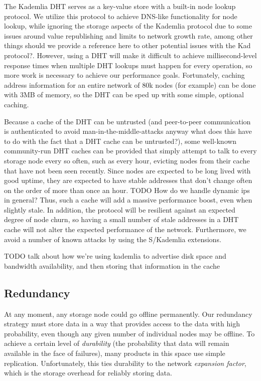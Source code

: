 \documentclass[a4paper,10pt]{article} \usepackage[utf8]{inputenc}
\newcommand{\todo}[1]{{\color{red} TODO #1 }}
\newcommand{\bs}[1]{{\color{red}#1}}
\begin{document}
The Kademlia DHT serves as a key-value store with a built-in node lookup
protocol. We utilize this protocol to achieve DNS-like functionality for node
lookup, while ignoring the storage aspects of the Kademlia protocol due to some
issues around value republishing and limits to network growth rate, among 
other things \bs{should we provide a reference here to other potential issues 
with the Kad protocol?}.
However, using a DHT will make it difficult to achieve millisecond-level
response times when multiple DHT lookups must happen for every operation, so
more work is necessary to achieve our performance goals. Fortunately, caching
address information for an entire network of 80k nodes (for example) can be done
with 3MB of memory, so the DHT can be sped up with some simple, optional
caching.

Because a cache of the DHT can be untrusted (and peer-to-peer communication is
authenticated to avoid man-in-the-middle-attacks anyway \bs{what does this have 
to do with the fact that a DHT cache can be untrusted?}), some well-known
community-run DHT caches can be provided that simply attempt to talk to every
storage node every so often, such as every hour, evicting nodes from their
cache that have not been seen recently.
Since nodes are expected to be long lived with good uptime, they
are expected to have stable addresses that don't change often on the order of
more than once an hour. \todo{How do we handle dynamic ips in general?} Thus, such a cache will add a massive performance boost, even when slightly stale.
In addition, the protocol will be resilient against an expected degree of node
churn, so having a small number of stale addresses in a DHT cache will not alter
the expected performance of the network. Furthermore, we avoid a number of known
attacks by using the S/Kademlia extensions. \cite{skad}

\todo{talk about how we're using kademlia to advertise disk space and bandwidth
availability, and then storing that information in the cache}

\subsection{Redundancy}

At any moment, any storage node could go offline permanently. Our redundancy
strategy must store data in a way that provides access to the data with high
probability, even though any given number of individual nodes may be offline. To
achieve a certain level of {\em durability} (the probability that data will
remain available in the face of failures), many products in this space use
simple replication. Unfortunately, this ties durability to the network {\em
expansion factor}, which is the storage overhead for reliably storing data.
\end{document}
